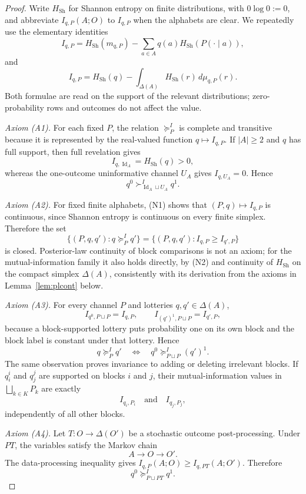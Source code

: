 \documentclass[11pt,a4paper]{article}
\theoremstyle{definition}
\newcommand{\Id}{\operatorname{Id}}
\newcommand{\Sh}{H_{\mathrm{Sh}}}
\newcommand{\1}{\mathbf 1}
\begin{document}
\begin{proof}
Write $\Sh$ for Shannon entropy on finite distributions, with $0\log0:=0$, and abbreviate $I_{q,P}(A;O)$ to
$I_{q,P}$ when the alphabets are clear.  We repeatedly use the elementary identities
\[
I_{q,P}
=
\Sh(m_{q,P})-\sum_{a\in A}q(a)\Sh(P(\cdot\mid a)),
\tag{N1}
\]
and
\[
I_{q,P}
=
\Sh(q)-\int_{\Delta(A)}\Sh(r)\,d\mu_{q,P}(r).
\tag{N2}
\]
Both formulae are read on the support of the relevant distributions; zero-probability rows and outcomes do not affect the
value.

\emph{Axiom \textup{(A1)}.}
For each fixed $P$, the relation $\succeq^I_P$ is complete and transitive because it is represented by the real-valued
function $q\mapsto I_{q,P}$.  If $|A|\ge2$ and $q$ has full support, then full revelation gives
\[
I_{q,\Id_A}=\Sh(q)>0,
\]
whereas the one-outcome uninformative channel $U_A$ gives $I_{q,U_A}=0$.  Hence
\[
q^0\succ^I_{\Id_A\sqcup U_A}q^1.
\]

\emph{Axiom \textup{(A2)}.}
For fixed finite alphabets, (N1) shows that $(P,q)\mapsto I_{q,P}$ is continuous, since Shannon entropy is continuous on
every finite simplex.  Therefore the set
\[
\{(P,q,q'):q\succeq^I_P q'\}
=
\{(P,q,q'):I_{q,P}\ge I_{q',P}\}
\]
is closed.  Posterior-law continuity of block comparisons is not an axiom; for the mutual-information family it also
holds directly, by (N2) and continuity of $\Sh$ on the compact simplex $\Delta(A)$, consistently with its derivation
from the axioms in Lemma~\ref{lem:plcont} below.

\emph{Axiom \textup{(A3)}.}
For every channel $P$ and lotteries $q,q'\in\Delta(A)$,
\[
I_{q^0,P\sqcup P}=I_{q,P},
\qquad
I_{(q')^1,P\sqcup P}=I_{q',P},
\]
because a block-supported lottery puts probability one on its own block and the block label is constant under that
lottery.  Hence
\[
q\succeq^I_P q'
\quad\Longleftrightarrow\quad
q^0\succeq^I_{P\sqcup P}(q')^1.
\]
The same observation proves invariance to adding or deleting irrelevant blocks.  If $q_i^i$ and $q_j^j$ are supported on
blocks $i$ and $j$, their mutual-information values in $\bigsqcup_{k\in K}P_k$ are exactly
\[
I_{q_i,P_i}
\quad\text{and}\quad
I_{q_j,P_j},
\]
independently of all other blocks.

\emph{Axiom \textup{(A4)}.}
Let $T:O\to\Delta(O')$ be a stochastic outcome post-processing.  Under $PT$, the variables satisfy the Markov chain
\[
A\longrightarrow O\longrightarrow O'.
\]
The data-processing inequality gives $I_{q,P}(A;O)\ge I_{q,PT}(A;O')$.  Therefore
\[
q^0\succeq^I_{P\sqcup PT}q^1.
\]


\end{proof}
\end{document}
